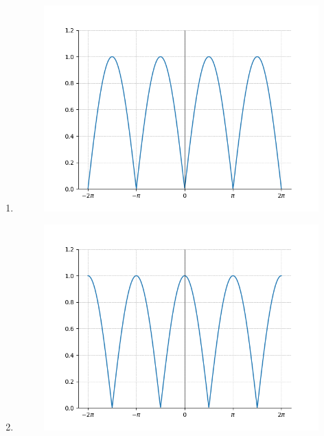 \begin{multicols}{2}
\begin{enumerate}
\begin{figure}[H]
                \caption{}
            \end{figure}
            \item 
            \begin{figure}[H]
                \centering
                \includegraphics[width = 1\linewidth]{Gate-yearwise/AI24BTECH11015/figs/10c.png}
                \caption{}
            \end{figure}
            \item 
            \begin{figure}[H]
                \centering
                \includegraphics[width = 1\linewidth]{Gate-yearwise/AI24BTECH11015/figs/10d.png}
                \caption{}
            \end{figure}
        \end{enumerate}
    \end{multicols}


